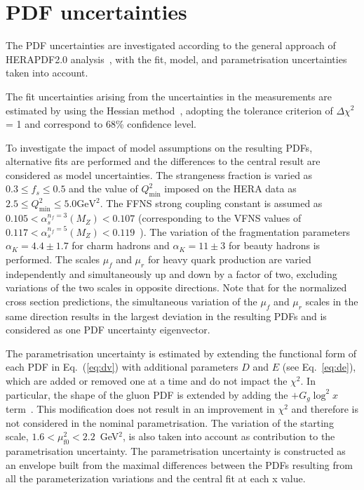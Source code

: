 \documentclass[12pt]{article}
\begin{document}
\section{PDF uncertainties}
\label{sec:pdfunc}

The PDF uncertainties are investigated according to the general approach of HERAPDF2.0 analysis~\cite{Abramowicz:2015mha}, with the fit, model, and parametrisation uncertainties taken into account.

The fit uncertainties arising from the uncertainties in the measurements are estimated by using the Hessian method~\cite{Pumplin:2001ct}, adopting the tolerance criterion of $\Delta \chi^2$ = 1 and correspond to 68\% confidence level.

To investigate the impact of model assumptions on the resulting PDFs, alternative fits are performed and the differences to the central result are considered as model uncertainties. The strangeness fraction is varied as $0.3 \leq f_{s} \leq 0.5$ and the value of $Q^2_{\text{min}}$ imposed on the HERA data as $2.5 \leq Q^2_\textrm{min}\leq 5.0\textrm{GeV}^2$. The FFNS strong coupling constant is assumed as $0.105 < \alpha_s^{n_f=3}(M_Z) < 0.107$ (corresponding to the VFNS values of $0.117 < \alpha_s^{n_f=5}(M_Z) < 0.119$~\cite{Tanabashi:2018oca}). The variation of the fragmentation parameters $\alpha_K = 4.4 \pm 1.7$ for charm hadrons and $\alpha_K = 11 \pm 3$ for beauty hadrons is performed.
The scales $\mu_f$ and $\mu_r$ for heavy quark production are varied independently and simultaneously up and down by a factor of two, excluding variations of the two scales in opposite directions. Note that for 
the normalized cross section predictions, the simultaneous variation of the $\mu_f$ and $\mu_r$ scales in the same direction results in the largest deviation in the 
resulting PDFs and is considered as one PDF uncertainty eigenvector.

The parametrisation uncertainty is estimated by extending the functional form of each PDF in Eq.~(\ref{eq:dv}) with additional parameters $D$ and $E$ (see Eq.~\ref{eq:de}), 
which are added or removed one at a time and do not impact the $\chi^2$. 
In particular, the shape of the gluon PDF is extended by adding the $+G_g\log^2 x$ term~\cite{Bonvini:2019wxf}. This modification does not result in an improvement in $\chi^2$ and therefore is not considered in the nominal parametrisation. 
The variation of the starting scale, $1.6 < \mu_\mathrm{f0}^2 < 2.2$~GeV$^2$, is also taken into account as contribution to the parametrisation uncertainty. The parametrisation uncertainty is constructed as an envelope built from the maximal differences between the PDFs resulting from all the parameterization variations and the central fit at each x value.
\end{document}
